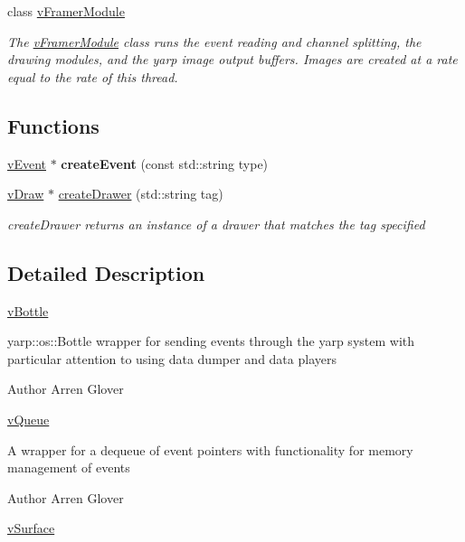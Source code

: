 \begin{DoxyCompactItemize}
class \hyperlink{classemorph_1_1vFramerModule}{v\-Framer\-Module}
\begin{DoxyCompactList}\small\item\em The \hyperlink{classemorph_1_1vFramerModule}{v\-Framer\-Module} class runs the event reading and channel splitting, the drawing modules, and the yarp image output buffers. Images are created at a rate equal to the rate of this thread. \end{DoxyCompactList}\end{DoxyCompactItemize}
\subsection*{Functions}
\begin{DoxyCompactItemize}
\item 
\hypertarget{namespaceemorph_a054d7f95bb736869a8fd935a5fa4dc86}{\hyperlink{classemorph_1_1vEvent}{v\-Event} $\ast$ {\bfseries create\-Event} (const std\-::string type)}\label{namespaceemorph_a054d7f95bb736869a8fd935a5fa4dc86}

\item 
\hyperlink{classemorph_1_1vDraw}{v\-Draw} $\ast$ \hyperlink{namespaceemorph_ae969d2a4bd07eef9230b24c49865f5d4}{create\-Drawer} (std\-::string tag)
\begin{DoxyCompactList}\small\item\em create\-Drawer returns an instance of a drawer that matches the tag specified \end{DoxyCompactList}\end{DoxyCompactItemize}


\subsection{Detailed Description}
\hyperlink{classemorph_1_1vBottle}{v\-Bottle}

yarp\-::os\-::\-Bottle wrapper for sending events through the yarp system with particular attention to using data dumper and data players

\begin{DoxyAuthor}{Author}
Arren Glover
\end{DoxyAuthor}
\hyperlink{classemorph_1_1vQueue}{v\-Queue}

A wrapper for a dequeue of event pointers with functionality for memory management of events

\begin{DoxyAuthor}{Author}
Arren Glover
\end{DoxyAuthor}
\hyperlink{classemorph_1_1vSurface}{v\-Surface}

